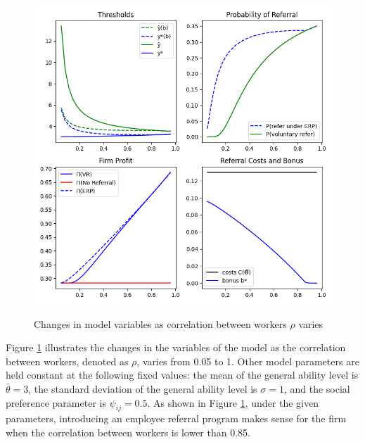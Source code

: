\documentclass[12pt]{article}
\begin{document}
\begin{figure}[ht]
    \caption{Changes in model variables as correlation between workers $\rho$ varies}
    \includegraphics[width=12cm]{images/imperf_rho_var.png}
    \centering
    \label{fig:rho_var}
\end{figure}

Figure \ref{fig:rho_var} illustrates the changes in the  variables of the model as the correlation between workers, denoted as $\rho$, varies from 0.05 to 1. Other model parameters are held constant at the following fixed values: the mean of the general ability level is $\bar{\theta} = 3$, the standard deviation of the general ability level is $\sigma = 1$, and the social preference parameter is $\psi_{ij} = 0.5$. As shown in Figure \ref{fig:rho_var}, under the given parameters, introducing an employee referral program makes sense for the firm when the correlation between workers is lower than 0.85.
\end{document}
